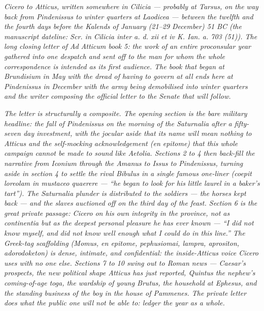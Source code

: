 
\textit{Cicero to Atticus, written somewhere in Cilicia
--- probably at Tarsus, on the way back from Pindenissus
to winter quarters at Laodicea --- between the twelfth
and the fourth days before the Kalends of January
(21--29 December) 51 BC (the manuscript dateline:
\textit{Scr. in Cilicia inter a. d. xii et iv K. Ian.
a. 703 (51)}). The long closing letter of \textit{Ad
Atticum} book 5: the work of an entire proconsular year
gathered into one despatch and sent off to the man for
whom the whole correspondence is intended as its first
audience. The book that began at Brundisium in May
with the dread of having to govern at all ends here at
Pindenissus in December with the army being demobilised
into winter quarters and the writer composing the
official letter to the Senate that will follow.}

\textit{The letter is structurally a composite. The
opening section is the bare military headline: the fall
of Pindenissus on the morning of the Saturnalia after a
fifty-seven day investment, with the jocular aside that
its name will mean nothing to Atticus and the
self-mocking acknowledgement (\textit{en epitome}) that
this whole campaign cannot be made to sound like
Aetolia. Sections 2 to 4 then back-fill the narrative
from Iconium through the Amanus to Issus to Pindenissus,
turning aside in section 4 to settle the rival Bibulus
in a single famous one-liner (\textit{coepit loreolam
in mustaceo quaerere} --- ``he began to look for his
little laurel in a baker's tart''). The Saturnalia
plunder is distributed to the soldiers --- the horses
kept back --- and the slaves auctioned off on the third
day of the feast. Section 6 is the great private
passage: Cicero on his own integrity in the province,
not as continentia but as the deepest personal pleasure
he has ever known --- ``I did not know myself, and did
not know well enough what I could do in this line.''
The Greek-tag scaffolding (\textit{Momus}, \textit{en
epitome}, \textit{pephusiomai}, \textit{lampra},
\textit{aprositon}, \textit{adorodoketon}) is dense,
intimate, and confidential: the inside-Atticus voice
Cicero uses with no one else. Sections 7 to 10 swing
out to Roman news --- Caesar's prospects, the new
political shape Atticus has just reported, Quintus the
nephew's coming-of-age toga, the wardship of young
Brutus, the household at Ephesus, and the standing
business of the boy in the house of Pammenes. The
private letter does what the public one will not be
able to: ledger the year as a whole.}

